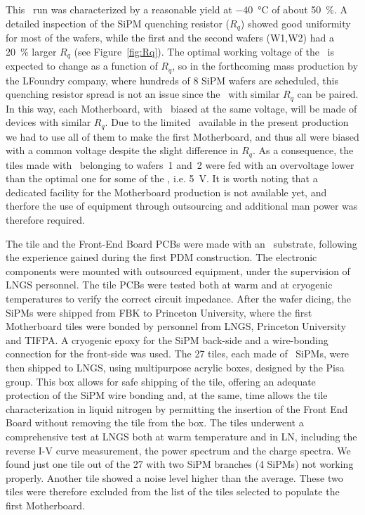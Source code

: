 This \SiPM\ run was characterized by a reasonable yield at \SI{-40}{\celsius} of about \SI{50}{\percent}.  A detailed inspection of the SiPM quenching resistor ($R_q$) showed good uniformity for most of the wafers, while the first and the second wafers (W1,W2) had a \SI{20}{\percent} larger $R_q$ (see Figure~\ref{fig:Rq}). The optimal working voltage of the \SiPM\ is expected to change as a function of $R_q$, so in the forthcoming mass production by the LFoundry company, where hundreds of \SI{8}{\inch} SiPM wafers are scheduled, this quenching resistor spread is not an issue since the \SiPMs\ with similar $R_q$ can be paired.  In this way, each Motherboard, with \DSkPdms\ biased at the same voltage, will be made of devices with similar $R_q$. Due to the limited \SiPMs\ available in the present production we had to use all of them to make the first Motherboard, and thus all were biased with a common voltage despite the slight difference in $R_q$.  As a consequence, the tiles made with \SiPMs\ belonging to wafers~1 and~2 were fed with an overvoltage lower than the optimal one for some of the \SiPMs, i.e. \SI{5}{\volt}.  It is worth noting that a dedicated facility for the Motherboard production is not available yet, and therfore the use of equipment through outsourcing and  additional man power was therefore required.

The tile and the Front-End Board PCBs were made with an \ArlonFiveFiveNT\ substrate, following the experience gained during the first PDM construction. The electronic components were mounted with outsourced equipment, under the supervision of LNGS personnel. The tile PCBs were tested both at warm and at cryogenic temperatures to verify the correct circuit impedance. After the wafer dicing, the SiPMs were shipped from FBK to Princeton University, where the first Motherboard tiles were bonded by personnel from LNGS, Princeton University and TIFPA. A cryogenic epoxy for the SiPM back-side and a wire-bonding connection for the front-side was used. The 27 tiles, each made of \DSkTileSiPMsCustomNumber\ SiPMs, were then shipped to LNGS, using multipurpose acrylic boxes, designed by the Pisa group. This box allows for safe shipping of the tile, offering an adequate protection of the SiPM wire bonding and, at the same, time allows the tile characterization in liquid nitrogen by permitting the insertion of the Front End Board without removing the tile from the box. The tiles underwent a comprehensive test at LNGS both at warm temperature and in LN, including the reverse I-V curve measurement, the power spectrum and the charge spectra. We found just one tile out of the 27 with two SiPM branches (4 SiPMs) not working properly. Another tile showed a noise level higher than the average. These two tiles were therefore excluded from the list of the tiles selected to populate the first Motherboard.

